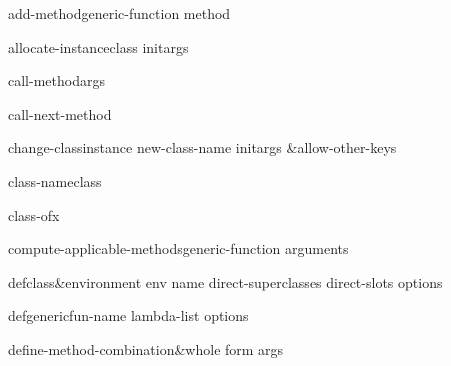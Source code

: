 \begin{generic}{add-method}{generic-function method}{}
  
\end{generic}

\begin{generic}{allocate-instance}{class \rest initargs}{}
  
\end{generic}

\begin{local-macro}{call-method}{\rest args}{}
  
\end{local-macro}

\begin{local-function}{call-next-method}{}{}
  
\end{local-function}

\begin{generic}{change-class}{instance new-class-name \rest initargs &allow-other-keys}{}
  
\end{generic}

\begin{generic}{class-name}{class}{}
  
\end{generic}

\begin{function}{class-of}{x}{}
  
\end{function}

\begin{generic}{compute-applicable-methods}{generic-function arguments}{}
  
\end{generic}

\begin{macro}{defclass}{&environment env name direct-superclasses direct-slots \rest options}{}
  
\end{macro}

\begin{macro}{defgeneric}{fun-name lambda-list \body options}{}
  
\end{macro}

\begin{macro}{define-method-combination}{&whole form \rest args}{}
  
\end{macro}

